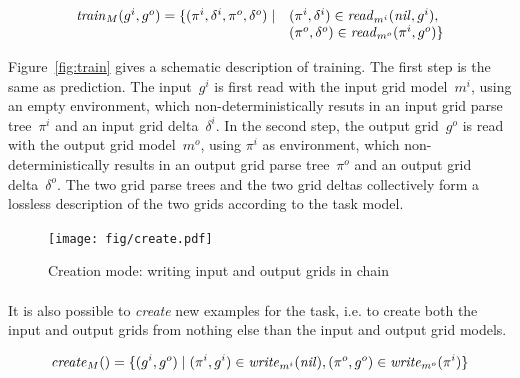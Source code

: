 \documentclass[a4paper]{llncs}
\newcommand{\HIDE}[1]{}
\begin{document}
\HIDE{ On output grids~$y_k$, we use parsing rather than
  generating. This is explained by the fact that description lengths
  are used at the learning stage rather than at the application
  stage. During learning, output models are incomplete, and still
  require some parameters and delta to generate the output
  grid~$y_k$. However, this output grid is available during learning
  (for train examples), and using parsing enables to find which
  parameters and delta are required. The objective of learning is to
  make those output parameters and delta become empty. Knowing what
  are the required parameters and delta can help the learner improve
  the model in this direction.}


\[\begin{array}{rl}
    {\it train}_M(g^i,g^o) = \{ (\pi^i,\delta^i,\pi^o,\delta^o) \mid & (\pi^i,\delta^i) \in {\it read}_{m^i}({\it nil},g^i),\\
                                                                     & (\pi^o,\delta^o) \in {\it read}_{m^o}(\pi^i,g^o) \}
  \end{array}\]

Figure~\ref{fig:train} gives a schematic description of training. The
first step is the same as prediction. The input~$g^i$ is first read
with the input grid model~$m^i$, using an empty environment, which
non-deterministically resuts in an input grid parse tree~$\pi^i$ and
an input grid delta~$\delta^i$. In the second step, the output
grid~$g^o$ is read with the output grid model~$m^o$, using $\pi^i$ as
environment, which non-deterministically results in an output grid
parse tree~$\pi^o$ and an output grid delta~$\delta^o$.
%
The two grid parse trees and the two grid deltas collectively form a
lossless description of the two grids according to the task model.


\begin{figure}[t]
  \centering
  \texttt{[image: fig/create.pdf]}
  \caption{Creation mode: writing input and output grids in chain}
  \label{fig:create}
\end{figure}

\paragraph{}
It is also possible to {\em create} new examples for the task, i.e. to
create both the input and output grids from nothing else than the
input and output grid models.

\[{\it create}_M() = \{ (g^i,g^o) \mid (\pi^i,g^i) \in {\it write}_{m^i}({\it nil}), (\pi^o,g^o) \in {\it write}_{m^o}(\pi^i) \} \]
\end{document}
